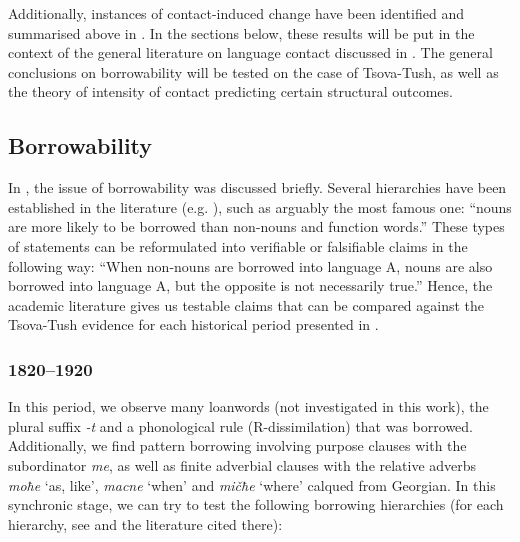 Additionally, instances of contact-induced change have been identified and summarised above in . In the sections below, these results will be put in the context of the general literature on language contact discussed in . The general conclusions on borrowability will be tested on the case of Tsova-Tush, as well as the theory of intensity of contact predicting certain structural outcomes. 

\subsection{Borrowability} \label{conclborrow}

In , the issue of borrowability was discussed briefly. Several hierarchies have been established in the literature (e.g. \cite{moravcsik1978universalscontact,thomasonkaufman1988,vanhoutmuysken1944borrow,field2002borrow,matras2011universals}), such as arguably the most famous one: ``nouns are more likely to be borrowed than non-nouns and function words.'' These types of statements can be reformulated into verifiable or falsifiable claims in the following way: ``When non-nouns are borrowed into language A, nouns are also borrowed into language A, but the opposite is not necessarily true.'' Hence, the academic literature gives us testable claims that can be compared against the Tsova-Tush evidence for each historical period presented in .

\subsubsection{1820--1920}

In this period, we observe many loanwords (not investigated in this work), the plural suffix \textit{-t} and a phonological rule (R-dissimilation) that was borrowed. Additionally, we find pattern borrowing involving purpose clauses with the subordinator \textit{me}, as well as finite adverbial clauses with the relative adverbs \textit{moħe} `as, like', \textit{macne} `when' and \textit{mičħe} `where' calqued from Georgian. In this synchronic stage, we can try to test the following borrowing hierarchies (for each hierarchy, see \textcite{matras2011universals} and the literature cited there):\largerpage

